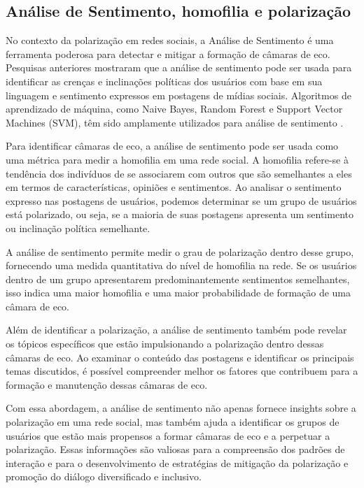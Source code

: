 \subsection*{Análise de Sentimento, homofilia e polarização}

No contexto da polarização em redes sociais, a Análise de Sentimento é uma ferramenta poderosa para detectar e mitigar a formação de câmaras de eco. Pesquisas anteriores mostraram que a análise de sentimento pode ser usada para identificar as crenças e inclinações políticas dos usuários com base em sua linguagem e sentimento expressos em postagens de mídias sociais. Algoritmos de aprendizado de máquina, como Naive Bayes, Random Forest e Support Vector Machines (SVM), têm sido amplamente utilizados para análise de sentimento \cite{2014_Hutto}.

Para identificar câmaras de eco, a análise de sentimento pode ser usada como uma métrica para medir a homofilia em uma rede social. A homofilia refere-se à tendência dos indivíduos de se associarem com outros que são semelhantes a eles em termos de características, opiniões e sentimentos. Ao analisar o sentimento expresso nas postagens de usuários, podemos determinar se um grupo de usuários está polarizado, ou seja, se a maioria de suas postagens apresenta um sentimento ou inclinação política semelhante.

A análise de sentimento permite medir o grau de polarização dentro desse grupo, fornecendo uma medida quantitativa do nível de homofilia na rede. Se os usuários dentro de um grupo apresentarem predominantemente sentimentos semelhantes, isso indica uma maior homofilia e uma maior probabilidade de formação de uma câmara de eco.

Além de identificar a polarização, a análise de sentimento também pode revelar os tópicos específicos que estão impulsionando a polarização dentro dessas câmaras de eco. Ao examinar o conteúdo das postagens e identificar os principais temas discutidos, é possível compreender melhor os fatores que contribuem para a formação e manutenção dessas câmaras de eco.

Com essa abordagem, a análise de sentimento não apenas fornece insights sobre a polarização em uma rede social, mas também ajuda a identificar os grupos de usuários que estão mais propensos a formar câmaras de eco e a perpetuar a polarização. Essas informações são valiosas para a compreensão dos padrões de interação e para o desenvolvimento de estratégias de mitigação da polarização e promoção do diálogo diversificado e inclusivo.

